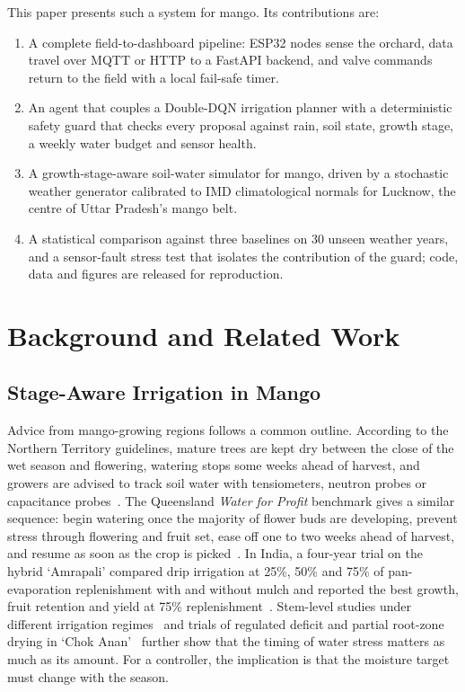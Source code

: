 \documentclass[conference]{IEEEtran}
\begin{document}
This paper presents such a system for mango. Its contributions are:
\begin{enumerate}
\item A complete field-to-dashboard pipeline: ESP32 nodes sense the orchard, data travel over MQTT or HTTP to a FastAPI backend, and valve commands return to the field with a local fail-safe timer.
\item An agent that couples a Double-DQN irrigation planner with a deterministic safety guard that checks every proposal against rain, soil state, growth stage, a weekly water budget and sensor health.
\item A growth-stage-aware soil-water simulator for mango, driven by a stochastic weather generator calibrated to IMD climatological normals for Lucknow, the centre of Uttar Pradesh's mango belt.
\item A statistical comparison against three baselines on 30 unseen weather years, and a sensor-fault stress test that isolates the contribution of the guard; code, data and figures are released for reproduction.
\end{enumerate}

\section{Background and Related Work}

\subsection{Stage-Aware Irrigation in Mango}
\label{sec:bg-stage}
Advice from mango-growing regions follows a common outline. According to the Northern Territory guidelines, mature trees are kept dry between the close of the wet season and flowering, watering stops some weeks ahead of harvest, and growers are advised to track soil water with tensiometers, neutron probes or capacitance probes~\cite{ntdaf}. The Queensland \emph{Water for Profit} benchmark gives a similar sequence: begin watering once the majority of flower buds are developing, prevent stress through flowering and fruit set, ease off one to two weeks ahead of harvest, and resume as soon as the crop is picked~\cite{wfp}. In India, a four-year trial on the hybrid `Amrapali' compared drip irrigation at 25\%, 50\% and 75\% of pan-evaporation replenishment with and without mulch and reported the best growth, fruit retention and yield at 75\% replenishment~\cite{samant2017}. Stem-level studies under different irrigation regimes~\cite{hahn2022} and trials of regulated deficit and partial root-zone drying in `Chok Anan'~\cite{spreer2009} further show that the timing of water stress matters as much as its amount. For a controller, the implication is that the moisture target must change with the season.
\end{document}
